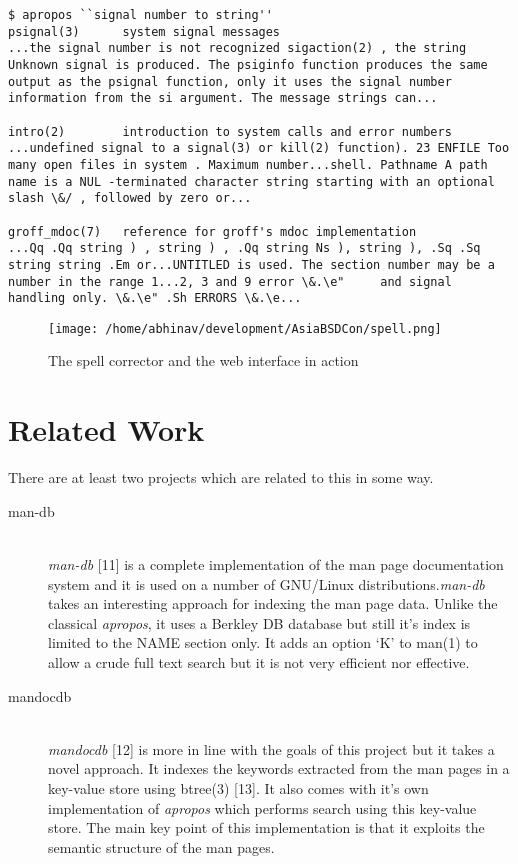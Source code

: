 \documentclass[titlepage, a4paper, 12pt]{article}
\begin{document}
\begin{lstlisting}
$ apropos ``signal number to string''
psignal(3)      system signal messages
...the signal number is not recognized sigaction(2) , the string
Unknown signal is produced. The psiginfo function produces the same
output as the psignal function, only it uses the signal number
information from the si argument. The message strings can...

intro(2)        introduction to system calls and error numbers
...undefined signal to a signal(3) or kill(2) function). 23 ENFILE Too
many open files in system . Maximum number...shell. Pathname A path
name is a NUL -terminated character string starting with an optional
slash \&/ , followed by zero or...

groff_mdoc(7)   reference for groff's mdoc implementation
...Qq .Qq string ) , string ) , .Qq string Ns ), string ), .Sq .Sq
string string .Em or...UNTITLED is used. The section number may be a
number in the range 1...2, 3 and 9 error \&.\e"     and signal
handling only. \&.\e" .Sh ERRORS \&.\e...
\end{lstlisting}

\begin{figure}[htp]
\texttt{[image: /home/abhinav/development/AsiaBSDCon/spell.png]}
\caption{The spell corrector and the web interface in action}
\label{}
\end{figure}
\section{Related Work}
There are at least two projects which are related to this in some way.
\begin{description}
\item[man-db] \hfill \\
\textit{man-db} [11] is a complete implementation of the man page documentation
system and it is used on a number of GNU/Linux distributions.\textit{man-db}
takes an interesting approach for indexing the man page data. Unlike the
classical \textit{apropos}, it uses a Berkley DB database but still it's index
is limited to the NAME section only. It adds an option `K' to man(1) to allow a
crude full text search but it is not very efficient nor effective.
\end{description}
\begin{description}
\item[mandocdb] \hfill \\
\textit{mandocdb} [12] is more in line with the goals of this project but it
takes a novel approach. It indexes the keywords extracted from the man pages in a
key-value store using btree(3) [13]. It also comes with it's own implementation
of \textit{apropos} which performs search using this key-value store. The
main key point of this implementation is that it exploits the semantic structure
of the man pages.
\end{description}
\end{document}
